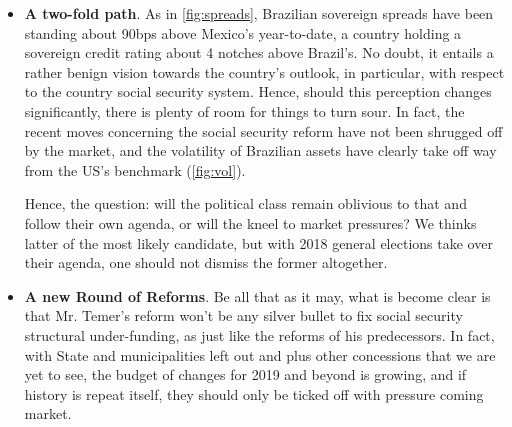 \documentclass{report}
\begin{document}
\begin{figure}[h]\centering
{}
\end{figure}

\begin{itemize}
\item \textbf{A two-fold path}. As in \ref{fig:spreads}, Brazilian sovereign
spreads have been standing about 90bps above Mexico's year-to-date,
a country holding a sovereign credit rating about 4 notches above
Brazil's. No doubt, it entails a rather benign vision towards the
country's outlook, in particular, with respect to the country social
security system.  Hence, should this perception changes
significantly, there is plenty of room for things to turn sour. In
fact, the recent moves concerning the social security reform have
not been shrugged off by the market, and the volatility of Brazilian
assets have clearly take off way from the US's benchmark (\ref{fig:vol}).

Hence, the question: will the political class remain oblivious to
that and follow their own agenda, or will the kneel to market
pressures? We thinks latter of the most likely candidate, but with
2018 general elections take over their agenda, one should not
dismiss the former altogether.

\item \textbf{A new Round of Reforms}. Be all that as it may, what is become
clear is that Mr. Temer's reform won't be any silver bullet to fix
social security structural under-funding, as just like the reforms
of his predecessors. In fact, with State and municipalities left out
and plus other concessions that we are yet to see, the budget of
changes for 2019 and beyond is growing, and if history is repeat
itself, they should only be ticked off with pressure coming
market.
\end{itemize}
\end{document}
